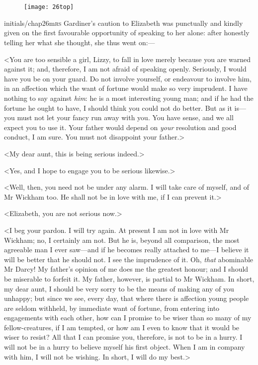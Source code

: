 \chapter[Chapter \thechapter]{}
	
\begin{figure}[t!]
\centering
\texttt{[image: 26top]}
\end{figure}


\lettrine[lines=6,image=true]{initials/chap26m}{rs}  Gardiner's caution to Elizabeth was punctually and kindly given on the first favourable opportunity of speaking to her alone: after honestly telling her what she thought, she thus went on:—

\zz
<You are too sensible a girl, Lizzy, to fall in love merely because you are warned against it; and, therefore, I am not afraid of speaking openly. Seriously, I would have you be on your guard. Do not involve yourself, or endeavour to involve him, in an affection which the want of fortune would make so very imprudent. I have nothing to say against \textit{him}: he is a most interesting young man; and if he had the fortune he ought to have, I should think you could not do better. But as it is—you must not let your fancy run away with you. You have sense, and we all expect you to use it. Your father would depend on \textit{your} resolution and good conduct, I am sure. You must not disappoint your father.>

<My dear aunt, this is being serious indeed.>

<Yes, and I hope to engage you to be serious likewise.>

<Well, then, you need not be under any alarm. I will take care of myself, and of Mr Wickham too. He shall not be in love with me, if I can prevent it.>

<Elizabeth, you are not serious now.>

<I beg your pardon. I will try again. At present I am not in love with Mr Wickham; no, I certainly am not. But he is, beyond all comparison, the most agreeable man I ever saw—and if he becomes really attached to me—I believe it will be better that he should not. I see the imprudence of it. Oh, \textit{that} abominable Mr Darcy! My father's opinion of me does me the greatest honour; and I should be miserable to forfeit it. My father, however, is partial to Mr Wickham. In short, my dear aunt, I should be very sorry to be the means of making any of you unhappy; but since we see, every day, that where there is affection young people are seldom withheld, by immediate want of fortune, from entering into engagements with each other, how can I promise to be wiser than so many of my fellow-creatures, if I am tempted, or how am I even to know that it would be wiser to resist? All that I can promise you, therefore, is not to be in a hurry. I will not be in a hurry to believe myself his first object. When I am in company with him, I will not be wishing. In short, I will do my best.>

